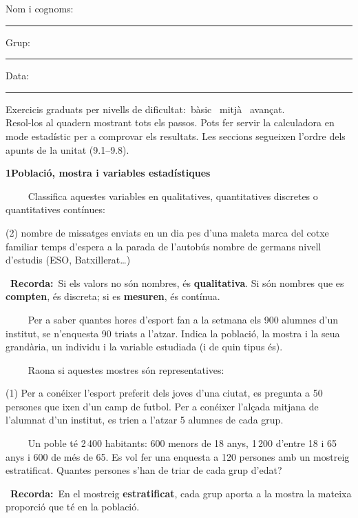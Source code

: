 \documentclass[11pt,a4paper]{article}
\newcommand{\estrelles}[1]{{\color{accent}\ifcase#1\or\faStar\faStar[regular]\faStar[regular]\or\faStar\faStar\faStar[regular]\or\faStar\faStar\faStar\fi}}
\newcounter{exer}
\newcommand{\ex}[1]{\par\needspace{4\baselineskip}\medskip\stepcounter{exer}\noindent{\color{navy}\bfseries\theexer.}\ \ {\small\estrelles{#1}}\ \ }
\newcommand{\seccio}[2]{\par\needspace{10\baselineskip}\bigskip
  \begin{tcolorbox}[colback=navy,colframe=navy,coltext=white,arc=2mm,boxrule=0pt,left=3mm,right=3mm,top=1.2mm,bottom=1.2mm]
  {\large\bfseries #1\quad #2}
  \end{tcolorbox}\vspace{-2pt}}
\newcommand{\recorda}[1]{\par\smallskip\begin{tcolorbox}[colback=accent!7,colframe=accent!55,arc=2mm,boxrule=0.5pt,left=2.5mm,right=2.5mm,top=1mm,bottom=1mm]\small{\color{accent}\faLightbulb[regular]}\ \textbf{Recorda:}\ #1\end{tcolorbox}}
\begin{document}
\thispagestyle{primera}

\vspace{10pt}
Nom i cognoms: \rule{8.4cm}{0.4pt}\hfill Grup: \rule{1.6cm}{0.4pt}\hfill Data: \rule{2.2cm}{0.4pt}
\vspace{8pt}

\begin{tcolorbox}[colback=soft,colframe=soft,arc=2mm,left=3mm,right=3mm,top=1.5mm,bottom=1.5mm]
\small Exercicis graduats per nivells de dificultat:\quad \estrelles{1}\ bàsic \qquad \estrelles{2}\ mitjà \qquad \estrelles{3}\ avançat.\\[2pt] Resol-los al quadern mostrant tots els passos. Pots fer servir la calculadora en mode estadístic per a comprovar els resultats. Les seccions segueixen l'ordre dels apunts de la unitat (9.1--9.8).
\end{tcolorbox}

\seccio{1}{Població, mostra i variables estadístiques}

\ex{1} Classifica aquestes variables en qualitatives, quantitatives discretes o quantitatives contínues:\begin{tasks}(2)
  \task nombre de missatges enviats en un dia
  \task pes d'una maleta
  \task marca del cotxe familiar
  \task temps d'espera a la parada de l'autobús
  \task nombre de germans
  \task nivell d'estudis (ESO, Batxillerat…)
\end{tasks}\recorda{Si els valors no són nombres, és \textbf{qualitativa}. Si són nombres que es \textbf{compten}, és discreta; si es \textbf{mesuren}, és contínua.}

\ex{1} Per a saber quantes hores d'esport fan a la setmana els 900 alumnes d'un institut, se n'enquesta 90 triats a l'atzar. Indica la població, la mostra i la seua grandària, un individu i la variable estudiada (i de quin tipus és).

\ex{2} Raona si aquestes mostres són representatives:\begin{tasks}(1)
  \task Per a conéixer l'esport preferit dels joves d'una ciutat, es pregunta a 50 persones que ixen d'un camp de futbol.
  \task Per a conéixer l'alçada mitjana de l'alumnat d'un institut, es trien a l'atzar 5 alumnes de cada grup.
\end{tasks}

\ex{2} Un poble té 2\,400 habitants: 600 menors de 18 anys, 1\,200 d'entre 18 i 65 anys i 600 de més de 65. Es vol fer una enquesta a 120 persones amb un mostreig estratificat. Quantes persones s'han de triar de cada grup d'edat?\recorda{En el mostreig \textbf{estratificat}, cada grup aporta a la mostra la mateixa proporció que té en la població.}
\end{document}

